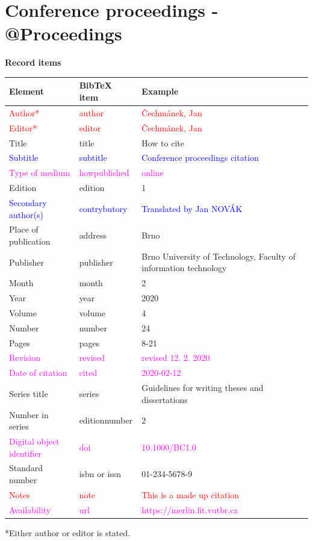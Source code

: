 \section*{Conference proceedings - @Proceedings}
\label{pr-sbornik}
\noindent \textbf{Record items}

\medskip

\begin{tabularx}{\linewidth}{X X X}
    Element & BibTeX item & Example\\\hline
    \textcolor{red}{Author*} & \textcolor{red}{author} & \textcolor{red}{Čechmánek, Jan}\\
    \textcolor{red}{Editor*} & \textcolor{red}{editor} & \textcolor{red}{Čechmánek, Jan}\\
    Title & title & How to cite\\
    \textcolor{blue}{Subtitle} & \textcolor{blue}{subtitle} & \textcolor{blue}{Conference proceedings citation}\\
    \textcolor{magenta}{Type of medium} & \textcolor{magenta}{howpublished} & \textcolor{magenta}{online}\\
    Edition & edition & 1\\
    \textcolor{blue}{Secondary author(s)} & \textcolor{blue}{contrybutory} & \textcolor{blue}{Translated by Jan NOVÁK}\\
    Place of publication & address & Brno\\
    Publisher & publisher & Brno University of Technology, Faculty of information technology\\
    Month & month & 2\\
    Year & year & 2020\\
    Volume & volume & 4\\
    Number & number & 24\\
    Pages & pages & 8-21\\
    \textcolor{magenta}{Revision} & \textcolor{magenta}{revised} & \textcolor{magenta}{revised 12. 2. 2020}\\
    \textcolor{magenta}{Date of citation} & \textcolor{magenta}{cited} & \textcolor{magenta}{2020-02-12}\\
    Series title & series & Guidelines for writing theses and dissertations\\
    Number in series & editionnumber & 2\\
    \textcolor{magenta}{Digital object identifier} & \textcolor{magenta}{doi} & \textcolor{magenta}{10.1000/BC1.0}\\
    Standard number & isbn or issn & 01-234-5678-9\\
    \textcolor{red}{Notes} & \textcolor{red}{note} & \textcolor{red}{This is a made up citation}\\
    \textcolor{magenta}{Availability} & \textcolor{magenta}{url} & \textcolor{magenta}{https://merlin.fit.vutbr.cz}
\end{tabularx}
*Either author or editor is stated.

